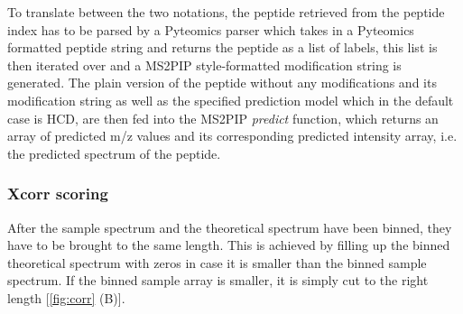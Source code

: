 \documentclass[11pt]{article}
\begin{document}
To translate between the two notations, the peptide retrieved from the peptide index has to be parsed by a Pyteomics parser which takes in a Pyteomics formatted peptide string and returns the peptide as a list of labels, this list is then iterated over and a MS2PIP style-formatted modification string is generated. The plain version of the peptide without any modifications and its modification string as well as the specified prediction model which in the default case is HCD, are then fed into the MS2PIP \textit{predict} function, which returns an array of predicted m/z values and its corresponding predicted intensity array, i.e. the predicted spectrum of the peptide.

\subsubsection{Xcorr scoring}
After the sample spectrum and the theoretical spectrum have been binned, they have to be brought to the same length. This is achieved by filling up the binned theoretical spectrum with zeros in case it is smaller than the binned sample spectrum. If the binned sample array is smaller, it is simply cut to the right length [\cref{fig:corr} (B)].
\end{document}
